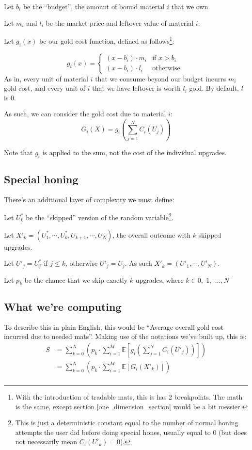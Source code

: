 \documentclass[a4paper,11pt]{article}
\begin{document}
\noindent
Let $b_i$ be the ``budget'', the amount of bound material $i$ that we own.

\noindent
Let $m_i$ and $l_i$ be the market price and leftover value of material $i$.

\noindent
Let $g_i(x)$ be our gold cost function, defined as follows\footnote{With the introduction of tradable mats, this is has 2 breakpoints. The math is the same, except section \ref{one_dimension_section} would be a bit messier.}:

$$
g_i(x) =  \begin{cases}
  (x - b_i) \cdot   m_i  & \text{if } x > b_i \\
     (x - b_i) \cdot   l_i& \text{otherwise }
\end{cases}
$$
As in, every unit of material $i$ that we consume beyond our budget incurrs $m_i$ gold cost, and every unit of $i$ that we have leftover is worth $l_i$ gold.  By default, $l$ is 0. 

As such, we can consider the gold cost due to material $i$:
$$
G_i(X) = g_i ( \sum^N_{j=1}C_i(U_j))
$$

Note that $g_i$ is applied to the sum, not the cost of the individual upgrades.
\newpage
\subsection{Special honing}

There's an additional layer of complexity we must define:

\noindent
Let $U^*_k$ be the ``skipped'' version of the random variable\footnote{This is just a deterministic constant equal to the number of normal honing attempts the user did before doing special hones, usually equal to 0 (but does not necessarily mean $C_i(U'_k) = 0$).}. 


\noindent
Let $X'_k = (U^*_1,\cdots , U^*_k, U_{k+1}, \cdots, U_N)$, the overall outcome with $k$ skipped upgrades.

\noindent
Let $U'_j = U^*_j$ if $j \leq k$, otherwise $U'_j = U_j$. As such $X'_k = (U'_1,\cdots, U'_N)$.

\noindent
Let $p_k$ be the chance that we skip exactly $k$ upgrades, where $k \in 0,$ $1,$ $\ldots, N$

\subsection{What we're computing}

To describe this in plain English, this would be ``Average overall gold cost incurred due to needed mats''. Making use of the notations we've built up, this is:
\begin{align*}
S &= \sum^N_{k=0} (p_k  \cdot \sum^M_{i=1}  \mathbb{E}[ g_i ( \sum^N_{j=1}C_i(U'_j))  ]) \\
&= \sum^N_{k=0} (p_k  \cdot \sum^M_{i=1}  \mathbb{E}[  G_i(X'_k)  ]) \\
\end{align*}
\end{document}
